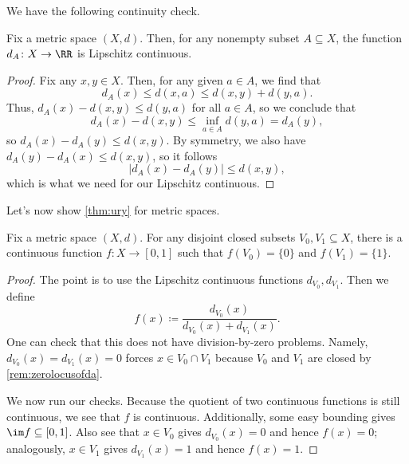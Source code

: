 \documentclass[../notes.tex]{subfiles}
\begin{document}
We have the following continuity check.
\begin{lemma}
	Fix a metric space $(X,d)$. Then, for any nonempty subset $A\subseteq X$, the function $d_A\colon X\to\RR$ is Lipschitz continuous.
\end{lemma}
\begin{proof}
	Fix any $x,y\in X$. Then, for any given $a\in A$, we find that
	\[d_A(x)\le d(x,a)\le d(x,y)+d(y,a).\]
	Thus, $d_A(x)-d(x,y)\le d(y,a)$ for all $a\in A$, so we conclude that
	\[d_A(x)-d(x,y)\le\inf_{a\in A}d(y,a)=d_A(y),\]
	so $d_A(x)-d_A(y)\le d(x,y)$. By symmetry, we also have $d_A(y)-d_A(x)\le d(x,y)$, so it follows
	\[\big|d_A(x)-d_A(y)\big|\le d(x,y),\]
	which is what we need for our Lipschitz continuous.
\end{proof}
Let's now show \autoref{thm:ury} for metric spaces.
\begin{proposition}
	Fix a metric space $(X,d)$. For any disjoint closed subsets $V_0,V_1\subseteq X$, there is a continuous function $f\colon X\to[0,1]$ such that $f(V_0)=\{0\}$ and $f(V_1)=\{1\}$.
\end{proposition}
\begin{proof}
	The point is to use the Lipschitz continuous functions $d_{V_0},d_{V_1}$. Then we define
	\[f(x)\coloneqq\frac{d_{V_0}(x)}{d_{V_0}(x)+d_{V_1}(x)}.\]
	One can check that this does not have division-by-zero problems. Namely, $d_{V_0}(x)=d_{V_1}(x)=0$ forces $x\in V_0\cap V_1$ because $V_0$ and $V_1$ are closed by \autoref{rem:zerolocusofda}.
	
	We now run our checks. Because the quotient of two continuous functions is still continuous, we see that $f$ is continuous. Additionally, some easy bounding gives $\im f\subseteq[0,1]$. Also see that $x\in V_0$ gives $d_{V_0}(x)=0$ and hence $f(x)=0$; analogously, $x\in V_1$ gives $d_{V_1}(x)=1$ and hence $f(x)=1$.
\end{proof}
\end{document}
